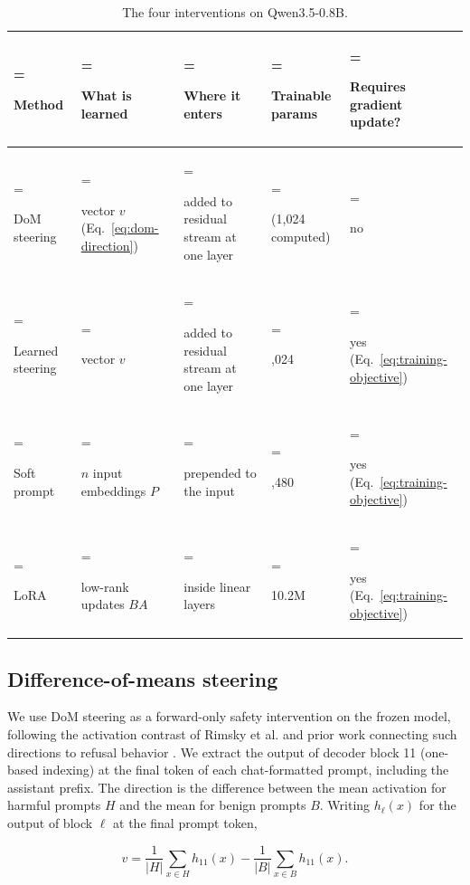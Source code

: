 \documentclass{article}
\begin{document}
\begin{table}[!htbp]
\centering
\caption{The four interventions on Qwen3.5-0.8B.}\label{tab:1}
\small
\setlength{\tabcolsep}{4pt}
\renewcommand{\arraystretch}{1.12}
\begin{tabularx}{\linewidth}{@{}>{\hsize=1.02\hsize\linewidth=\hsize\raggedright\arraybackslash}X>{\hsize=1.04\hsize\linewidth=\hsize\raggedright\arraybackslash}X>{\hsize=1.32\hsize\linewidth=\hsize\raggedright\arraybackslash}X>{\hsize=0.84\hsize\linewidth=\hsize\raggedright\arraybackslash}X>{\hsize=0.78\hsize\linewidth=\hsize\raggedright\arraybackslash}X@{}}
\toprule
\textbf{Method} & \textbf{What is learned} & \textbf{Where it enters} & \textbf{Trainable params} & \textbf{Requires gradient update?} \\
\midrule
DoM steering & vector $v$ (Eq.~\eqref{eq:dom-direction}) & added to residual stream at one layer & 0 (1,024 computed) & no \\
Learned steering & vector $v$ & added to residual stream at one layer & 1,024 & yes (Eq.~\eqref{eq:training-objective}) \\
Soft prompt & $n$ input embeddings $P$ & prepended to the input & 20,480 & yes (Eq.~\eqref{eq:training-objective}) \\
LoRA & low-rank updates $BA$ & inside linear layers & 10.2M & yes (Eq.~\eqref{eq:training-objective}) \\
\bottomrule
\end{tabularx}
\end{table}

\subsection{Difference-of-means steering}\label{sec:3.3}

We use DoM steering as a forward-only safety intervention on the frozen model, following the activation contrast of Rimsky et al. \cite{ref7} and prior work connecting such directions to refusal behavior \cite{ref8}. We extract the output of decoder block 11 (one-based indexing) at the final token of each chat-formatted prompt, including the assistant prefix. The direction is the difference between the mean activation for harmful prompts $H$ and the mean for benign prompts $B$. Writing $h_{\ell}(x)$ for the output of block $\ell$ at the final prompt token,

\begin{equation}
\label{eq:dom-direction}
v = \frac{1}{|H|}\sum_{x\in H} h_{11}(x) - \frac{1}{|B|}\sum_{x \in B} h_{11}(x).
\end{equation}
\end{document}
